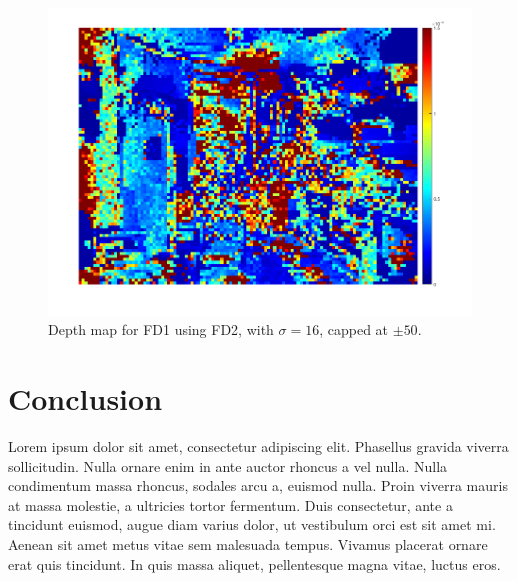 \documentclass[a4paper, 10pt, conference]{ieeeconf}
\begin{document}
\begin{figure}[!ht]
  \centering
  \includegraphics[width=\linewidth]{pic/q2_2_e_gaussian}
	\caption{Depth map for FD1 using FD2, with $\sigma = 16$, capped at $\pm 50$.}
  \label{fig:q2_2_e_gaussian}
\end{figure}


\section{Conclusion}
Lorem ipsum dolor sit amet, consectetur adipiscing elit. Phasellus gravida viverra sollicitudin. Nulla ornare enim in ante auctor rhoncus a vel nulla. Nulla condimentum massa rhoncus, sodales arcu a, euismod nulla. Proin viverra mauris at massa molestie, a ultricies tortor fermentum. Duis consectetur, ante a tincidunt euismod, augue diam varius dolor, ut vestibulum orci est sit amet mi. Aenean sit amet metus vitae sem malesuada tempus. Vivamus placerat ornare erat quis tincidunt. In quis massa aliquet, pellentesque magna vitae, luctus eros.




\onecolumn
\end{document}
